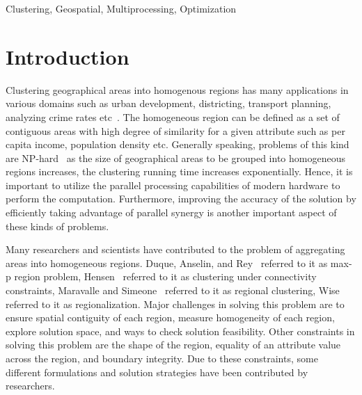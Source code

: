 \documentclass[conference]{IEEEtran}
\begin{document}
\begin{IEEEkeywords}
Clustering, Geospatial, Multiprocessing, Optimization
\end{IEEEkeywords}

\section{Introduction}
Clustering geographical areas into homogenous regions has many applications in
various domains such as urban development, districting, transport planning,
analyzing crime rates etc~\cite{r26}. The homogeneous region can be defined as a set
of contiguous areas with high degree of similarity for a given attribute such as
per capita income, population density etc. Generally speaking, problems of this kind are
 NP-hard~\cite{r1} as the size of geographical areas to be
grouped into homogeneous regions increases, the clustering running time
increases exponentially. Hence, it is important to utilize the parallel
processing capabilities of modern hardware to perform the computation. Furthermore, improving the accuracy of the solution by efficiently taking advantage of parallel synergy is another important aspect of these kinds of problems.

Many researchers and scientists have contributed to the problem of aggregating
areas into homogeneous regions. Duque, Anselin, and Rey~\cite{r1} referred to it
as max-p region problem, Hensen~\cite{r2} referred to it as clustering under
connectivity constraints, Maravalle and Simeone~\cite{r3} referred to it as
regional clustering, Wise~\cite{r25} referred to it as regionalization. Major
challenges in solving this problem are to ensure spatial contiguity of each
region, measure homogeneity of each region, explore solution space, and ways to
check solution feasibility. Other constraints in solving this problem are the shape
of the region, equality of an attribute value across the region, and boundary
integrity. Due to these constraints, some different formulations and
solution strategies have been contributed by researchers.
\end{document}
